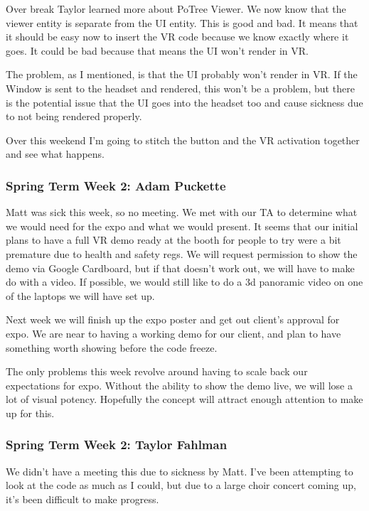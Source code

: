\documentclass[draftclsnofoot,onecolumn]{IEEEtran}
\begin{document}
Over break Taylor learned more about PoTree Viewer. We now know that the viewer entity is separate from the UI entity. This is good and bad. It means that it should be easy now to insert the VR code because we know exactly where it goes. It could be bad because that means the UI won't render in VR.

The problem, as I mentioned, is that the UI probably won't render in VR. If the Window is sent to the headset and rendered, this won't be a problem, but there is the potential issue that the UI goes into the headset too and cause sickness due to not being rendered properly.

Over this weekend I'm going to stitch the button and the VR activation together and see what happens.

\subsubsection{Spring Term Week 2: Adam Puckette}

Matt was sick this week, so no meeting. We met with our TA to determine what we would need for the expo and what we would present. It seems that our initial plans to have a full VR demo ready at the booth for people to try were a bit premature due to health and safety regs. We will request permission to show the demo via Google Cardboard, but if that doesn't work out, we will have to make do with a video. If possible, we would still like to do a 3d panoramic video on one of the laptops we will have set up.

Next week we will finish up the expo poster and get out client's approval for expo. We are near to having a working demo for our client, and plan to have something worth showing before the code freeze.

The only problems this week revolve around having to scale back our expectations for expo. Without the ability to show the demo live, we will lose a lot of visual potency. Hopefully the concept will attract enough attention to make up for this.

\subsubsection{Spring Term Week 2: Taylor Fahlman}

We didn't have a meeting this due to sickness by Matt. I've been attempting to look at the code as much as I could, but due to a large choir concert coming up, it's been difficult to make progress.
\end{document}
